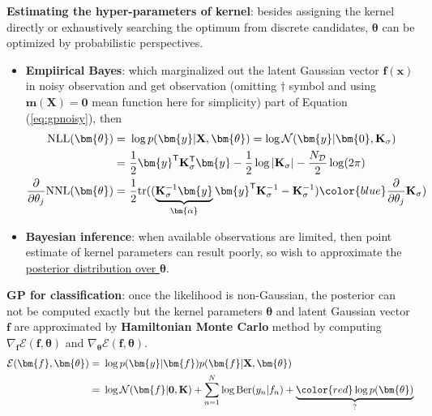 \textbf{Estimating the hyper-parameters of kernel}: besides assigning the kernel directly or 
exhaustively searching the optimum from discrete candidates, 
$\bm{\theta}$ can be optimized by probabilistic perspectives.
\begin{itemize}
    \item \textbf{Empiirical Bayes}: which marginalized out the latent Gaussian vector $\bm{f}(\bm{x})$ in noisy observation and get observation (omitting $\dagger$ symbol and using $\bm{m}(\mathbf{X})=\bm{0}$ mean function here for simplicity) part of Equation (\ref{eq:gpnoisy}), then 
    \begin{align}
        \mathrm{NLL}(\bm{\theta}) 
        =&~ \log p(\bm{y}|\mathbf{X},\bm{\theta})
        = \log \mathcal{N}(\bm{y}|\bm{0},\mathbf{K}_\sigma) \\
        =&~ \frac{1}{2}\bm{y}^\mathsf{T}\mathbf{K}_\sigma^\mathsf{T}\bm{y} - \frac{1}{2}\log|\mathbf{K}_\sigma| - \frac{N_\mathcal{D}}{2}\log(2\pi) \\
        \frac{\partial}{\partial\theta_j}\mathrm{NNL}(\bm{\theta})
        =&~ \frac{1}{2}\mathrm{tr}(
        (\underbrace{\mathbf{K}_\sigma^{-1}\bm{y}}_{\bm{\alpha}}\bm{y}^\mathsf{T}\mathbf{K}_\sigma^{-1}-\mathbf{K}_\sigma^{-1})
        {\color{blue}\frac{\partial}{\partial\theta_j}\mathbf{K}_\sigma}
        )
    \end{align}
    \item \textbf{Bayesian inference}: when available observations are limited, 
    then point estimate of kernel parameters can result poorly,
    so wish to approximate the \uline{posterior distribution over $\bm{\theta}$}.
\end{itemize}

\textbf{GP for classification}: once the likelihood is non-Gaussian, the posterior can not be computed exactly but the kernel parameters $\bm{\theta}$ and latent Gaussian vector $\bm{f}$
are approximated by \textbf{Hamiltonian Monte Carlo} method 
by computing $\nabla_{\bm{f}}\mathcal{E}(\bm{f},\bm{\theta})$ and $\nabla_{\bm{\theta}}\mathcal{E}(\bm{f},\bm{\theta})$.
\begin{align}
    \mathcal{E}(\bm{f},\bm{\theta})
    =&~ \log p(\bm{y}|\bm{f})p(\bm{f}|\mathbf{X},\bm{\theta}) \\
    =&~ \log \mathcal{N}(\bm{f}|\mathbf{0},\mathbf{K}) + \sum_{n=1}^N \log \mathrm{Ber}(y_n|f_n) + \underbrace{\color{red}\log p(\bm{\theta})}_{?}
\end{align}

